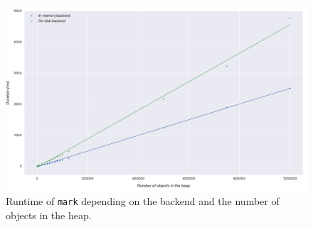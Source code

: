 \begin{figure}[ht]
  \caption{Runtime of \texttt{mark} depending on the backend and the number of objects in the heap.}
  \label{fig:mark-benchmark}

  \centering
  \includegraphics[width=\textwidth]{images/mark_bench.png}
\end{figure}
